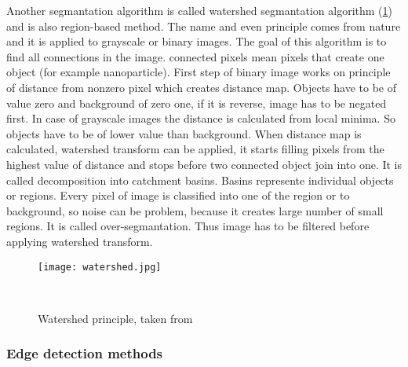         Another segmantation algorithm is called watershed segmantation algorithm (\ref{fig:watershed}) and is also region-based method. The name and even principle comes from nature and it is applied
        to grayscale or binary images. The goal of this algorithm is to find all connections in the image. connected pixels mean pixels that create one object (for example nanoparticle).
        First step of binary image works on principle of distance from nonzero pixel which creates distance map. Objects have to be of value zero and background of zero one,
        if it is reverse, image has to be negated first. In case of grayscale images the distance is calculated from local minima. So objects have to be of lower value than background.
        When distance map is calculated, watershed transform can be applied, it starts filling pixels from the highest value of distance and stops before two connected object join into one.
        It is called decomposition into catchment basins. Basins represente individual objects or regions. Every pixel of image is classified into one of the region or to background,
        so noise can be problem, because it creates large number of small regions. It is called over-segmantation. Thus image has to be filtered before applying watershed transform.~\cite{2, 3}
        
        \begin{figure}[h]
            \texttt{[image: watershed.jpg]}
            \caption{Watershed principle, taken from~\cite{20}}~\label{fig:watershed}
        \end{figure}

\subsubsection{Edge detection methods}

